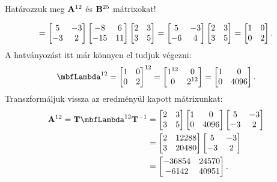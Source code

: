 \begin{exercise}{Határozzuk meg $\mathbf{A}^{12}$ és $\mathbf{B}^{25}$ mátrixokat!}
{\[    = \begin{bmatrix}
      5  & -3 \\
      -3 & 2
    \end{bmatrix} \begin{bmatrix}
      -8  & 6  \\
      -15 & 11
    \end{bmatrix} \begin{bmatrix}
      2 & 3 \\
      3 & 5
    \end{bmatrix}
    =
    \begin{bmatrix}
      5  & -3 \\
      -6 & 4
    \end{bmatrix} \begin{bmatrix}
      2 & 3 \\
      3 & 5
    \end{bmatrix}
    =
    \begin{bmatrix}
      1 & 0 \\
      0 & 2
    \end{bmatrix}
    \text.
  \]
  A hatványozást itt már könnyen el tudjuk végezni:
  \[
    \mbfLambda^{12}
    = \begin{bmatrix} 1 & 0 \\ 0 & 2 \end{bmatrix}^{12}
    = \begin{bmatrix} 1^{12} & 0 \\ 0 & 2^{12} \end{bmatrix}
    = \begin{bmatrix} 1 & 0 \\ 0 & 4096  \end{bmatrix}
    \text.
  \]
  Transzformáljuk vissza az eredményül kapott mátrixunkat:
  \begin{align*}
    \rmat A^{12} = \rmat T \mbfLambda^{12} \rmat T^{-1}
     & =
    \begin{bmatrix} 2 & 3 \\ 3 & 5 \end{bmatrix}
    \begin{bmatrix} 1 & 0 \\ 0 & 4096 \end{bmatrix}
    \begin{bmatrix} 5  & -3 \\ -3 & 2 \end{bmatrix}
    \\
     & =
    \begin{bmatrix} 2 & 12288 \\ 3 & 20480 \end{bmatrix}
    \begin{bmatrix} 5  & -3 \\ -3 & 2 \end{bmatrix}
    \\
     & =
    \begin{bmatrix}
      -36854 & 24570 \\
      -6142  & 40951
    \end{bmatrix}
    \text.
  \end{align*}

}
\end{exercise}
